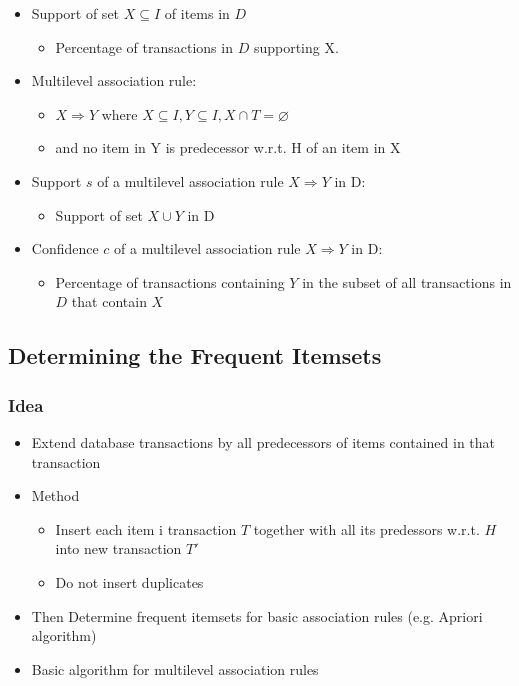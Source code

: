 \documentclass[../notes.tex]{subfiles}
\begin{document}
\begin{itemize}
  \item Support of set $X \subseteq I$ of items in $D$
  \begin{itemize}
    \item Percentage of transactions in $D$ supporting X.
  \end{itemize}

  \item Multilevel association rule:
  \begin{itemize}
    \item $X \Rightarrow Y$ where $X \subseteq I, Y \subseteq I, X \cap T = \varnothing$
    \item and no item in Y is predecessor w.r.t. H of an item in X
  \end{itemize}

  \item Support $s$ of a multilevel association rule $X \Rightarrow Y$ in D:
  \begin{itemize}
    \item Support of set $X \cup Y$ in D
  \end{itemize}

  \item Confidence $c$ of a multilevel association rule $X \Rightarrow Y$ in D:
  \begin{itemize}
    \item Percentage of transactions containing $Y$ in the subset of all transactions in $D$ that contain $X$
  \end{itemize}
\end{itemize}

\newpage

\subsection{Determining the Frequent Itemsets}
\subsubsection{Idea}
\begin{itemize}
  \item Extend database transactions by all predecessors of items contained in that transaction

  \item Method
  \begin{itemize}
    \item Insert each item i transaction $T$ together with all its predessors w.r.t. $H$ into new transaction $T'$ 
    \item Do not insert duplicates
  \end{itemize}
 
  \item Then Determine frequent itemsets for basic association rules (e.g. Apriori algorithm)

  \item Basic algorithm for multilevel association rules
\end{itemize}
\end{document}
